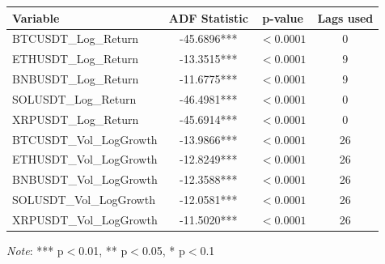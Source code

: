\begin{tabular}{lccc}
  \toprule
  \textbf{Variable} & \textbf{ADF Statistic} & \textbf{p-value} & \textbf{Lags used} \\ 
  \midrule
  BTCUSDT\_Log\_Return & -45.6896*** & $< 0.0001$ & 0 \\ 
  ETHUSDT\_Log\_Return & -13.3515*** & $< 0.0001$ & 9 \\ 
  BNBUSDT\_Log\_Return & -11.6775*** & $< 0.0001$ & 9 \\ 
  SOLUSDT\_Log\_Return & -46.4981*** & $< 0.0001$ & 0 \\ 
  XRPUSDT\_Log\_Return & -45.6914*** & $< 0.0001$ & 0 \\ 
  BTCUSDT\_Vol\_LogGrowth & -13.9866*** & $< 0.0001$ & 26 \\ 
  ETHUSDT\_Vol\_LogGrowth & -12.8249*** & $< 0.0001$ & 26 \\ 
  BNBUSDT\_Vol\_LogGrowth & -12.3588*** & $< 0.0001$ & 26 \\ 
  SOLUSDT\_Vol\_LogGrowth & -12.0581*** & $< 0.0001$ & 26 \\ 
  XRPUSDT\_Vol\_LogGrowth & -11.5020*** & $< 0.0001$ & 26 \\ 
  \bottomrule
\end{tabular}
\par\vspace{4pt}
\begin{minipage}{\linewidth}
  \footnotesize \textit{Note}: *** p$<$0.01, ** p$<$0.05, * p$<$0.1
\end{minipage}